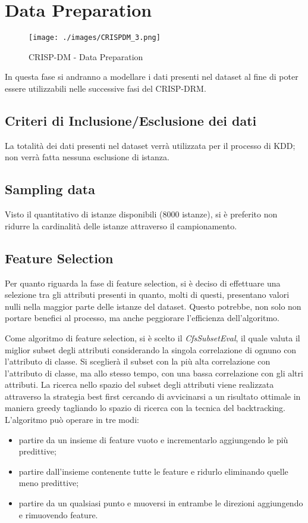 \chapter{Data Preparation}

\begin{figure}[hbtp]
	\centering
	\texttt{[image: ./images/CRISPDM\_3.png]}
	\caption{CRISP-DM - Data Preparation}
	\label{CRISPDM_3}
\end{figure}
In questa fase si andranno a modellare i dati presenti nel dataset al fine di poter essere utilizzabili nelle successive fasi del CRISP-DRM.
\section{Criteri di Inclusione/Esclusione dei dati}
La totalità dei dati presenti nel dataset verrà utilizzata per il processo di KDD; non verrà fatta nessuna esclusione di istanza.
\section{Sampling data}
Visto il quantitativo di istanze disponibili (8000 istanze), si è preferito non ridurre la cardinalità delle istanze attraverso il campionamento.
\section{Feature Selection}
\label{Feature Selection}
Per quanto riguarda la fase di feature selection, si è deciso di effettuare una selezione tra gli attributi presenti in quanto, molti di questi, presentano valori nulli nella maggior parte delle istanze del dataset. Questo potrebbe, non solo non portare benefici al processo, ma anche peggiorare l'efficienza dell'algoritmo.

Come algoritmo di feature selection, si è scelto il \textit{CfsSubsetEval}, il quale valuta il miglior subset degli attributi considerando la singola correlazione di ognuno con l'attributo di classe. Si sceglierà il subset con la più alta correlazione con l'attributo di classe, ma allo stesso tempo, con una bassa correlazione con gli altri attributi. La ricerca nello spazio del subset degli attributi viene realizzata attraverso la strategia best first cercando di avvicinarsi a un risultato ottimale in maniera greedy tagliando lo spazio di ricerca con la tecnica del backtracking.\cite{Hall1998}
L'algoritmo può operare in tre modi:
\begin{itemize}
	\item partire da un insieme di feature vuoto e incrementarlo aggiungendo le più predittive;
	\item partire dall'insieme contenente tutte le feature e ridurlo eliminando quelle meno predittive;
	\item partire da un qualsiasi punto e muoversi in entrambe le direzioni aggiungendo e rimuovendo feature.
\end{itemize}
